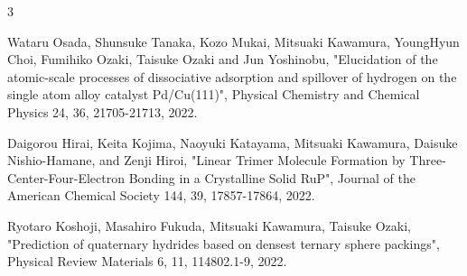 \begin{雑誌論文}{3}

Wataru Osada, Shunsuke Tanaka, Kozo Mukai, Mitsuaki Kawamura, YoungHyun Choi, Fumihiko Ozaki, Taisuke Ozaki and Jun Yoshinobu, 
"Elucidation of the atomic-scale processes of dissociative adsorption and spillover of hydrogen on the single atom alloy catalyst Pd/Cu(111)",
Physical Chemistry and Chemical Physics 24, 36, 21705-21713, 2022.

Daigorou Hirai, Keita Kojima, Naoyuki Katayama, Mitsuaki Kawamura, Daisuke Nishio-Hamane, and Zenji Hiroi,
"Linear Trimer Molecule Formation by Three-Center-Four-Electron Bonding in a Crystalline Solid RuP",
Journal of the American Chemical Society 144, 39, 17857-17864, 2022.

Ryotaro Koshoji, Masahiro Fukuda, Mitsuaki Kawamura, Taisuke Ozaki,
"Prediction of quaternary hydrides based on densest ternary sphere packings",
Physical Review Materials 6, 11, 114802.1-9, 2022.

\end{雑誌論文}

